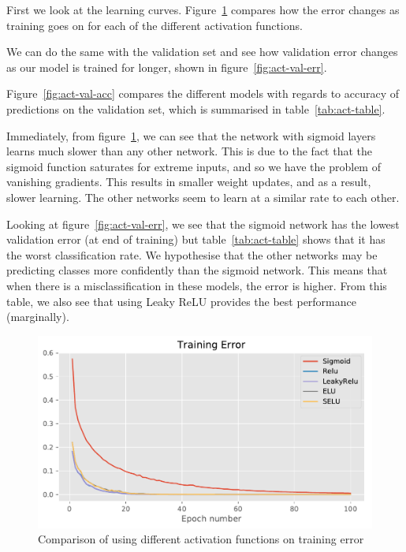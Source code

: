 \documentclass{article}
\begin{document}
First we look at the learning curves. Figure~\ref{fig:act-tr-err} compares how the error changes as training goes on for each of the different activation functions.    

We can do the same with the validation set and see how validation error changes as our model is trained for longer, shown in figure~\ref{fig:act-val-err}.

Figure~\ref{fig:act-val-acc} compares the different models with regards to accuracy of predictions on the validation set, which is summarised in table~\ref{tab:act-table}.

Immediately, from figure~\ref{fig:act-tr-err}, we can see that the network with sigmoid layers learns much slower than any other network. This is due to the fact that the sigmoid function saturates for extreme inputs, and so we have the problem of vanishing gradients. This results in smaller weight updates, and as a result, slower learning. The other networks seem to learn at a similar rate to each other.

Looking at figure~\ref{fig:act-val-err}, we see that the sigmoid network has the lowest validation error (at end of training) but table~\ref{tab:act-table} shows that it has the worst classification rate. We hypothesise that the other networks may be predicting classes more confidently than the sigmoid network. This means that when there is a misclassification in these models, the error is higher. From this table, we also see that using Leaky ReLU provides the best performance (marginally).
\begin{figure}[tb]
\vskip 5mm
\begin{center}
\centerline{\includegraphics[width=\columnwidth]{activations_tr_error}}
\caption{Comparison of using different activation functions on training error}
\label{fig:act-tr-err}
\end{center}
\vskip -5mm
\end{figure} 
\end{document}

